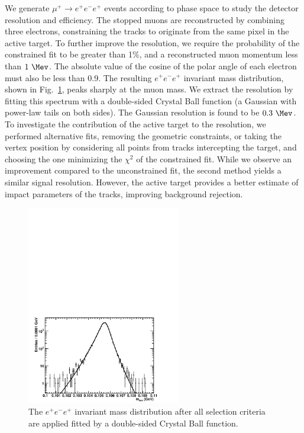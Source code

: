 We generate $\mu^+ \rightarrow e^+e^-e^+$ events according to phase space to study the detector resolution and efficiency. The stopped muons are reconstructed by combining three electrons, constraining the tracks to originate from the same pixel in the active target. To further improve the resolution, we require the probability of the constrained fit to be greater than 1\%, and a reconstructed muon momentum less than $1 ~\Mev$. The absolute value of the cosine of the polar angle of each electron must also be less than 0.9. The resulting $e^+e^-e^+$ invariant mass distribution, shown in Fig.~\ref{Fig::mu3e2}, peaks sharply at the muon mass. We extract the resolution by fitting this spectrum with a double-sided Crystal Ball function (a Gaussian with power-law tails on both sides). The Gaussian resolution is found to be $0.3~\Mev$. To investigate the contribution of the active target to the resolution, we performed alternative fits, removing the geometric constraints, or taking the vertex position by considering all points from tracks intercepting the target, and choosing the one minimizing the $\chi^2$ of the constrained fit. While we observe an improvement compared to the unconstrained fit, the second method yields a similar signal resolution. However, the active target provides a better estimate of impact parameters of the tracks, improving background rejection.

\begin{figure}[htb]
\begin{center}
\includegraphics[width=0.6\textwidth]{Figures/mu3e-resoFit.pdf}
\end{center}
\caption{The $e^+e^-e^+$ invariant mass distribution after all selection criteria are applied fitted by a double-sided Crystal Ball function.}
\label{Fig::mu3e2}
\end{figure}

